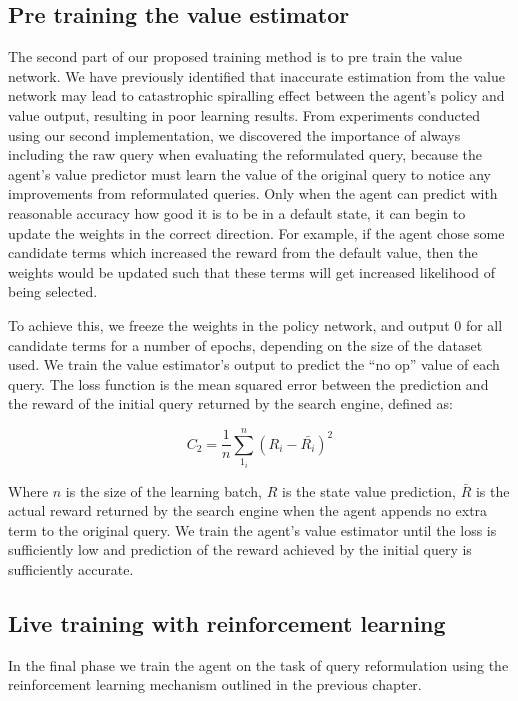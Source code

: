 \subsection{Pre training the value estimator}

The second part of our proposed training method is to pre train the value network. We have previously identified that inaccurate estimation from the value network may lead to catastrophic spiralling effect between the agent's policy and value output, resulting in poor learning results. From experiments conducted using our second implementation, we discovered the importance of always including the raw query when evaluating the reformulated query, because the agent's value predictor must learn the value of the original query to notice any improvements from reformulated queries. Only when the agent can predict with reasonable accuracy how good it is to be in a default state, it can begin to update the weights in the correct direction. For example, if the agent chose some candidate terms which increased the reward from the default value, then the weights would be updated such that these terms will get increased likelihood of being selected. 

To achieve this, we freeze the weights in the policy network, and output 0 for all candidate terms for a number of epochs, depending on the size of the dataset used. We train the value estimator's output to predict the ``no op'' value of each query. The loss function is the mean squared error between the prediction and the reward of the initial query returned by the search engine, defined as:

\begin{equation}
C_2 = \frac{1}{n}\sum_{1_i}^{n}(R_i-\bar{R_i})^2
\end{equation}

Where $n$ is the size of the learning batch, $R$ is the state value prediction, $\bar{R}$ is the actual reward returned by the search engine when the agent appends no extra term to the original query. We train the agent's value estimator until the loss is sufficiently low and prediction of the reward achieved by the initial query is sufficiently accurate. 


\subsection{Live training with reinforcement learning}

In the final phase we train the agent on the task of query reformulation using the reinforcement learning mechanism outlined in the previous chapter.



